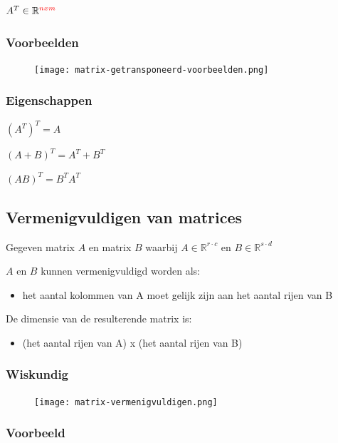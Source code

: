 \documentclass{article}
\begin{document}
$A^T \in \mathbb{R}^{\textcolor{red}{nxm}}$

\subsubsection{Voorbeelden}

\begin{figure}[H]
    \centering
    \texttt{[image: matrix-getransponeerd-voorbeelden.png]}
\end{figure}


\subsubsection{Eigenschappen}

$(A^T)^T = A$

$(A + B)^T = A^T + B^T$

$(AB)^T = B^T A^T$

\subsection{Vermenigvuldigen van matrices}

Gegeven matrix $A$ en matrix $B$ waarbij $A \in \mathbb{R}^{r\cdot c}$ en $B \in \mathbb{R}^{s \cdot d}$

$A$ en $B$ kunnen vermenigvuldigd worden als:

\begin{itemize}
    \item het aantal kolommen van A moet gelijk zijn aan het aantal rijen van B
\end{itemize}

De dimensie van de resulterende matrix is:

\begin{itemize}
    \item (het aantal rijen van A) x (het aantal rijen van B)
\end{itemize}

\subsubsection{Wiskundig}

\begin{figure}[H]
    \centering
    \texttt{[image: matrix-vermenigvuldigen.png]}
\end{figure}


\subsubsection{Voorbeeld}
\end{document}
